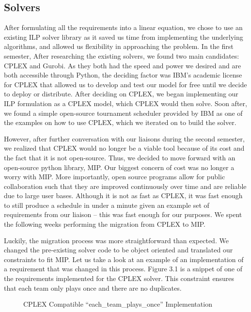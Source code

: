 \documentclass[book]{hmcclinic}
\begin{document}
\subsection{Solvers}
After formulating all the requirements into a linear equation, we chose to use an existing ILP solver library as it saved us time from implementing the underlying algorithms, and allowed us flexibility in approaching the problem. In the first semester, After researching the existing solvers, we found two main candidates: CPLEX and Gurobi. As they both had the speed and power we desired and are both accessible through Python, the deciding factor was IBM’s academic license for CPLEX that allowed us to develop and test our model for free until we decide to deploy or distribute. After deciding on CPLEX, we began implementing our ILP formulation as a CPLEX model, which CPLEX would then solve. Soon after, we found a simple open-source tournament scheduler provided by IBM as one of the examples on how to use CPLEX, which we iterated on to build the solver.

However, after further conversation with our liaisons during the second semester, we realized that CPLEX would no longer be a viable tool because of its cost and the fact that it is not open-source. Thus, we decided to move forward with an open-source python library, MIP. Our biggest concern of cost was no longer a worry with MIP. More importantly, open source programs allow for public collaboration such that they are improved continuously over time and are reliable due to large user bases. Although it is not as fast as CPLEX, it was fast enough to still produce a schedule in under a minute given an example set of requirements from our liaison -- this was fast enough for our purposes. We spent the following weeks performing the migration from CPLEX to MIP.

Luckily, the migration process was more straightforward than expected. We changed the pre-existing solver code to be object oriented and translated our constraints to fit MIP. Let us take a look at an example of an implementation of a requirement that was changed in this process. Figure 3.1 is a snippet of one of the requirements implemented for the CPLEX solver. This constraint ensures that each team only plays once and there are no duplicates. 

\begin{figure}[h]
    \centering
    \caption{CPLEX Compatible “each\_team\_plays\_once” Implementation}
\end{figure}
\end{document}
